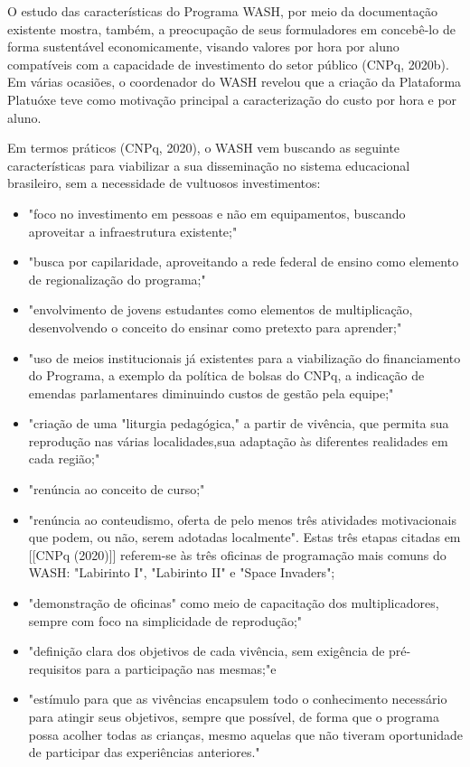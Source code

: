 O estudo das características do Programa WASH, por meio da documentação existente mostra, também, a preocupação de seus formuladores em concebê-lo de forma sustentável economicamente, visando valores por hora por aluno compatíveis com a capacidade de investimento do setor público  (CNPq, 2020b). Em várias ocasiões, o coordenador do WASH revelou que a criação da Plataforma Platuóxe teve como motivação principal a caracterização do custo por hora e por aluno.

Em termos práticos (CNPq, 2020), o WASH vem buscando as seguinte características para viabilizar a sua disseminação no sistema educacional brasileiro, sem a necessidade de vultuosos investimentos:


\begin{itemize}
\item "foco no investimento em pessoas e não em equipamentos, buscando aproveitar a infraestrutura existente;"
\item "busca por capilaridade, aproveitando a rede federal de ensino como elemento de regionalização do programa;"
\item "envolvimento de jovens estudantes como elementos de multiplicação, desenvolvendo o conceito do ensinar como pretexto para aprender;"
\item "uso de meios institucionais já existentes para a viabilização do financiamento do Programa, a exemplo da política de bolsas do CNPq, a indicação de emendas parlamentares diminuindo custos de gestão pela equipe;"
\item "criação de uma  "liturgia pedagógica," a partir de vivência, que permita sua reprodução nas várias localidades,sua adaptação às diferentes realidades em cada região;"
\item "renúncia ao conceito de curso;"
\item "renúncia ao conteudismo, oferta de pelo menos três atividades motivacionais que podem, ou não, serem adotadas localmente". Estas três etapas citadas em  [[CNPq (2020)]] referem-se às três oficinas de programação mais comuns do WASH: "Labirinto I", "Labirinto II" e "Space Invaders";
\item "demonstração de oficinas" como meio de capacitação dos multiplicadores, sempre com foco na
simplicidade de reprodução;"
\item "definição clara dos objetivos de cada vivência, sem exigência de pré-requisitos para a participação nas mesmas;"e
\item "estímulo para que as vivências encapsulem todo o conhecimento necessário para  atingir  seus objetivos, sempre que possível, de forma que o programa possa acolher todas as crianças, mesmo aquelas que não tiveram oportunidade de participar das experiências anteriores."
\end{itemize}

